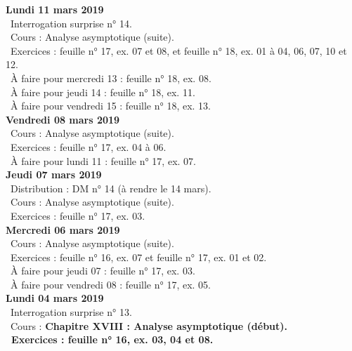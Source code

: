 \documentclass[12pt,a4paper]{article}
\begin{document}
\noindent\textbf{\bf Lundi 11 mars 2019} \\
\bu\ Interrogation surprise n° 14.\\
\bu\ Cours : Analyse asymptotique (suite).\\
\bu\ Exercices : feuille n° 17, ex. 07 et 08, et feuille n° 18, ex. 01 à 04, 06, 07, 10 et 12.\\
\bu\ À faire pour mercredi 13 : feuille n° 18, ex. 08.\\
\bu\ À faire pour jeudi 14 : feuille n° 18, ex. 11.\\
\bu\ À faire pour vendredi 15 : feuille n° 18, ex. 13.\vspace{.4cm}\\

\noindent\textbf{\bf Vendredi 08 mars 2019} \\
\bu\ Cours : Analyse asymptotique (suite).\\
\bu\ Exercices : feuille n° 17, ex. 04 à 06.\\
\bu\ À faire pour lundi 11 : feuille n° 17, ex. 07.\vspace{.4cm}\\

\noindent\textbf{Jeudi 07 mars 2019}\\
\bu\ Distribution : DM n° 14 (à rendre le 14 mars).\\
\bu\ Cours : Analyse asymptotique (suite).\\
\bu\ Exercices : feuille n° 17, ex. 03.\vspace{.4cm}\\

\noindent\textbf{Mercredi 06 mars 2019} \\
\bu\ Cours : Analyse asymptotique (suite).\\
\bu\ Exercices : feuille n° 16, ex. 07 et feuille n° 17, ex. 01 et 02.\\
\bu\ À faire pour jeudi 07 : feuille n° 17, ex. 03.\\
\bu\ À faire pour vendredi 08 : feuille n° 17, ex. 05.\vspace{.4cm}\\

\noindent\textbf{\bf Lundi 04 mars 2019} \\
\bu\ Interrogation surprise n° 13.\\
\bu\ Cours : \bf Chapitre XVIII \rm : Analyse asymptotique 
(début).\\
\bu\ Exercices : feuille n° 16, ex. 03, 04 et 08.\vspace{.4cm}\\
\end{document}
